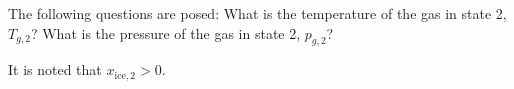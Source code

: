 The following questions are posed:  
What is the temperature of the gas in state 2, \( T_{g,2} \)?  
What is the pressure of the gas in state 2, \( p_{g,2} \)?  

It is noted that \( x_{\text{ice},2} > 0 \).